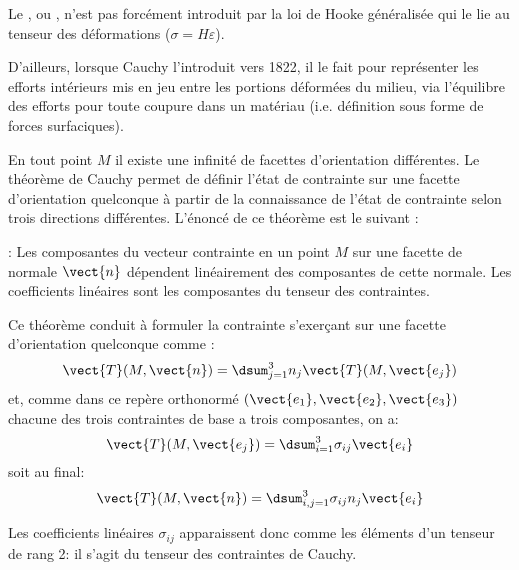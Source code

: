 \begin{histoire}%
Le , ou , 
n'est pas forcément introduit par la loi de Hooke généralisée qui le lie au tenseur des 
déformations ($\sigma=H\varepsilon$).

\medskip
D'ailleurs, lorsque Cauchy l'introduit 
vers 1822, il le fait pour représenter les efforts intérieurs
mis en jeu entre les portions déformées du milieu, via l'équilibre des efforts pour toute coupure 
dans un matériau (i.e. définition sous forme de forces surfaciques).

\medskip
{}%
En tout point $M$ il existe une infinité de facettes d'orientation différentes. 
 Le théorème de Cauchy 
 permet de définir l'état de contrainte sur une facette d'orientation quelconque 
à partir de la connaissance de l'état de contrainte selon trois directions différentes. 
L'énoncé de ce théorème est le suivant :

\begin{theoreme} :
Les composantes du vecteur contrainte en un point $M$ sur une facette de normale $\vect{n}$ dépendent 
linéairement des composantes de cette normale. Les coefficients linéaires sont les composantes du 
tenseur des contraintes.
\end{theoreme}

\medskip{}
Ce théorème conduit à formuler la contrainte s'exerçant sur une facette d'orientation quelconque comme :
\begin{equation}
\vect{T}(M,\vect{n}) = \dsum_{j=1}^3 n_j \vect{T}(M,\vect{e_j})
\end{equation}
et, comme dans ce repère orthonormé $(\vect{e_1},\vect{e_2},\vect{e_3})$ chacune des trois contraintes 
de base a trois composantes, on a:
\begin{equation}
\vect{T}(M,\vect{e_j}) = \dsum_{i=1}^3 \sigma_{ij}\vect{e_i}
\end{equation}
soit au final:
\begin{equation}
\vect{T}(M,\vect{n}) = \dsum_{i,j=1}^3 \sigma_{ij}n_j\vect{e_i}
\end{equation}

Les coefficients linéaires $\sigma_{ij}$ apparaissent donc comme les éléments d'un tenseur de rang 2: 
il s'agit du tenseur des contraintes de Cauchy.
\end{histoire}

